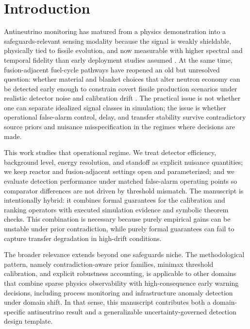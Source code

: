 \section{Introduction}\label{sec:introduction}
Antineutrino monitoring has matured from a physics demonstration into a safeguards-relevant sensing modality because the signal is weakly shieldable, physically tied to fissile evolution, and now measurable with higher spectral and temporal fidelity than early deployment studies assumed \citep{SRC035,SRC034,SRC023,SRC018,SRC009,SRC001}. At the same time, fusion-adjacent fuel-cycle pathways have reopened an old but unresolved question: whether material and blanket choices that alter neutron economy can be detected early enough to constrain covert fissile production scenarios under realistic detector noise and calibration drift \citep{SRC007,SRC010,SRC019,SRC025,SRC026,SRC028,SRC036}. The practical issue is not whether one can separate idealized signal classes in simulation; the issue is whether operational false-alarm control, delay, and transfer stability survive contradictory source priors and nuisance misspecification in the regimes where decisions are made.

This work studies that operational regime. We treat detector efficiency, background level, energy resolution, and standoff as explicit nuisance quantities; we keep reactor and fusion-adjacent settings open and parameterized; and we evaluate detection performance under matched false-alarm operating points so comparator differences are not driven by threshold mismatch. The manuscript is intentionally hybrid: it combines formal guarantees for the calibration and ranking operators with executed simulation evidence and symbolic theorem checks. This combination is necessary because purely empirical gains can be unstable under prior contradiction, while purely formal guarantees can fail to capture transfer degradation in high-drift conditions.

The broader relevance extends beyond one safeguards niche. The methodological pattern, namely contradiction-aware prior families, minimax threshold calibration, and explicit robustness accounting, is applicable to other domains that combine sparse physics observability with high-consequence early warning decisions, including process monitoring and infrastructure anomaly detection under domain shift. In that sense, this manuscript contributes both a domain-specific antineutrino result and a generalizable uncertainty-governed detection design template.

